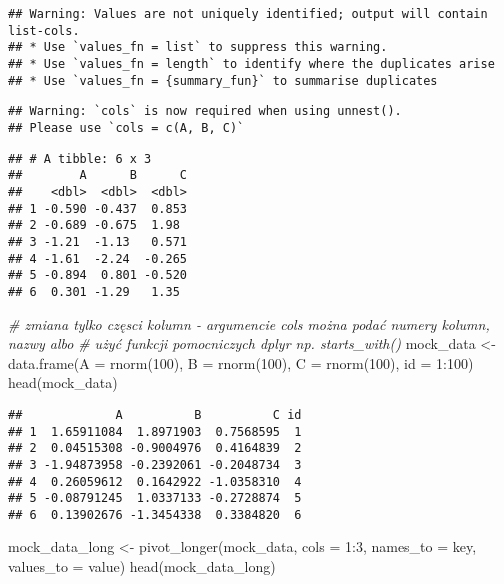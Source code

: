 \documentclass[
]{book}
\newenvironment{Shaded}{\begin{snugshade}}{\end{snugshade}}
\newcommand{\AttributeTok}[1]{\textcolor[rgb]{0.77,0.63,0.00}{#1}}
\newcommand{\CommentTok}[1]{\textcolor[rgb]{0.56,0.35,0.01}{\textit{#1}}}
\newcommand{\DecValTok}[1]{\textcolor[rgb]{0.00,0.00,0.81}{#1}}
\newcommand{\FunctionTok}[1]{\textcolor[rgb]{0.00,0.00,0.00}{#1}}
\newcommand{\NormalTok}[1]{#1}
\newcommand{\OtherTok}[1]{\textcolor[rgb]{0.56,0.35,0.01}{#1}}
\newcommand{\SpecialCharTok}[1]{\textcolor[rgb]{0.00,0.00,0.00}{#1}}
\newcommand{\StringTok}[1]{\textcolor[rgb]{0.31,0.60,0.02}{#1}}
\begin{document}
\begin{verbatim}
## Warning: Values are not uniquely identified; output will contain list-cols.
## * Use `values_fn = list` to suppress this warning.
## * Use `values_fn = length` to identify where the duplicates arise
## * Use `values_fn = {summary_fun}` to summarise duplicates
\end{verbatim}

\begin{verbatim}
## Warning: `cols` is now required when using unnest().
## Please use `cols = c(A, B, C)`
\end{verbatim}

\begin{verbatim}
## # A tibble: 6 x 3
##        A      B      C
##    <dbl>  <dbl>  <dbl>
## 1 -0.590 -0.437  0.853
## 2 -0.689 -0.675  1.98 
## 3 -1.21  -1.13   0.571
## 4 -1.61  -2.24  -0.265
## 5 -0.894  0.801 -0.520
## 6  0.301 -1.29   1.35
\end{verbatim}

\begin{Shaded}
\begin{Highlighting}[]
\CommentTok{\# zmiana tylko częsci kolumn {-} argumencie cols można podać numery kolumn, nazwy albo }
\CommentTok{\# użyć funkcji pomocniczych dplyr np. starts\_with()}
\NormalTok{mock\_data }\OtherTok{\textless{}{-}} \FunctionTok{data.frame}\NormalTok{(}\AttributeTok{A =} \FunctionTok{rnorm}\NormalTok{(}\DecValTok{100}\NormalTok{), }\AttributeTok{B =} \FunctionTok{rnorm}\NormalTok{(}\DecValTok{100}\NormalTok{), }\AttributeTok{C =} \FunctionTok{rnorm}\NormalTok{(}\DecValTok{100}\NormalTok{), }\AttributeTok{id =} \DecValTok{1}\SpecialCharTok{:}\DecValTok{100}\NormalTok{)}
\FunctionTok{head}\NormalTok{(mock\_data)}
\end{Highlighting}
\end{Shaded}

\begin{verbatim}
##             A          B          C id
## 1  1.65911084  1.8971903  0.7568595  1
## 2  0.04515308 -0.9004976  0.4164839  2
## 3 -1.94873958 -0.2392061 -0.2048734  3
## 4  0.26059612  0.1642922 -1.0358310  4
## 5 -0.08791245  1.0337133 -0.2728874  5
## 6  0.13902676 -1.3454338  0.3384820  6
\end{verbatim}

\begin{Shaded}
\begin{Highlighting}[]
\NormalTok{mock\_data\_long }\OtherTok{\textless{}{-}} \FunctionTok{pivot\_longer}\NormalTok{(mock\_data, }\AttributeTok{cols =} \DecValTok{1}\SpecialCharTok{:}\DecValTok{3}\NormalTok{, }\AttributeTok{names\_to =} \StringTok{\textquotesingle{}key\textquotesingle{}}\NormalTok{, }\AttributeTok{values\_to =} \StringTok{\textquotesingle{}value\textquotesingle{}}\NormalTok{)}
\FunctionTok{head}\NormalTok{(mock\_data\_long)}
\end{Highlighting}
\end{Shaded}
\end{document}

